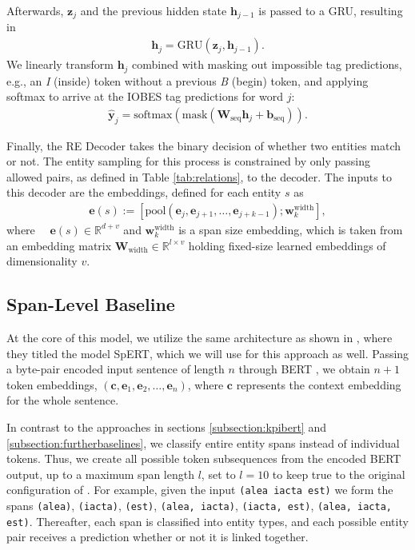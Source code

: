 \documentclass[conference, table]{IEEEtran}
\newcommand{\RR} {\mathbb R}
\newcommand{\1} {\mathbbm{1}}
\newcommand{\mat}{\bm}
\begin{document}
Afterwards, $\mat{z}_j$ and the previous hidden state $\mat{h}_{j-1}$ is passed to a GRU, resulting in
\begin{align}
    \mat{h}_j = \text{GRU}\left( \mat{z}_j, \mat{h}_{j-1}\right).
\end{align}
We linearly transform $\mat{h}_j$ combined with masking out impossible tag predictions, e.g., an \textit{I} (inside) token without a previous \textit{B} (begin) token, and applying softmax to arrive at the IOBES tag predictions for word $j$:
\begin{align}
    \mat{\hat{y}}_j = \text{softmax}\left( \text{mask}\left(\mat{W}_{\text{seq}} \mat{h}_j + \mat{b}_{\text{seq}}\right) \right).
\end{align}

Finally, the RE Decoder takes the binary decision of whether two entities match or not. The entity sampling for this process is constrained by only passing allowed pairs, as defined in Table \ref{tab:relations}, to the decoder. The inputs to this decoder are the embeddings, defined for each entity $s$ as
\begin{align}
    \mat{e}(s) := \left[\text{pool}(\mat{e}_j, \mat{e}_{j+1}, \dots, \mat{e}_{j+k-1});\mat{w}_{k}^\text{width}\right],
    \label{eq:span_representation}
\end{align}
where $\quad \mat{e}(s) \in \RR^{d+v}$ and $\mat{w}_{k}^\text{width}$ is a span size embedding, which is taken from an embedding matrix $\mat{W}_{\text{width}} \in \RR^{l \times v}$ holding fixed-size learned embeddings of dimensionality $v$.

\subsection{Span-Level Baseline}
\label{subsection:spert}

At the core of this model, we utilize the same architecture as shown in \cite{eberts2019span}, where they titled the model SpERT, which we will use for this approach as well. Passing a byte-pair encoded input sentence of length $n$ through BERT \cite{devlin2018bert}, we obtain $n+1$ token embeddings, $(\mat{c}, \mat{e}_1, \mat{e}_2, \dots, \mat{e}_n)$, where $\mat{c}$ represents the context embedding for the whole sentence. 

In contrast to the approaches in sections \ref{subsection:kpibert} and \ref{subsection:furtherbaselines}, we classify entire entity spans instead of individual tokens. Thus, we create all possible token subsequences from the encoded BERT output, up to a maximum span length $l$, set to $l=10$ to keep true to the original configuration of \cite{eberts2019span}. For example, given the input \texttt{(alea iacta est)} we form the spans \texttt{(alea)}, \texttt{(iacta)}, \texttt{(est)}, \texttt{(alea, iacta)}, \texttt{(iacta, est)}, \texttt{(alea, iacta, est)}. Thereafter, each span is classified into entity types, and each possible entity pair receives a prediction whether or not it is linked together. 
\end{document}

